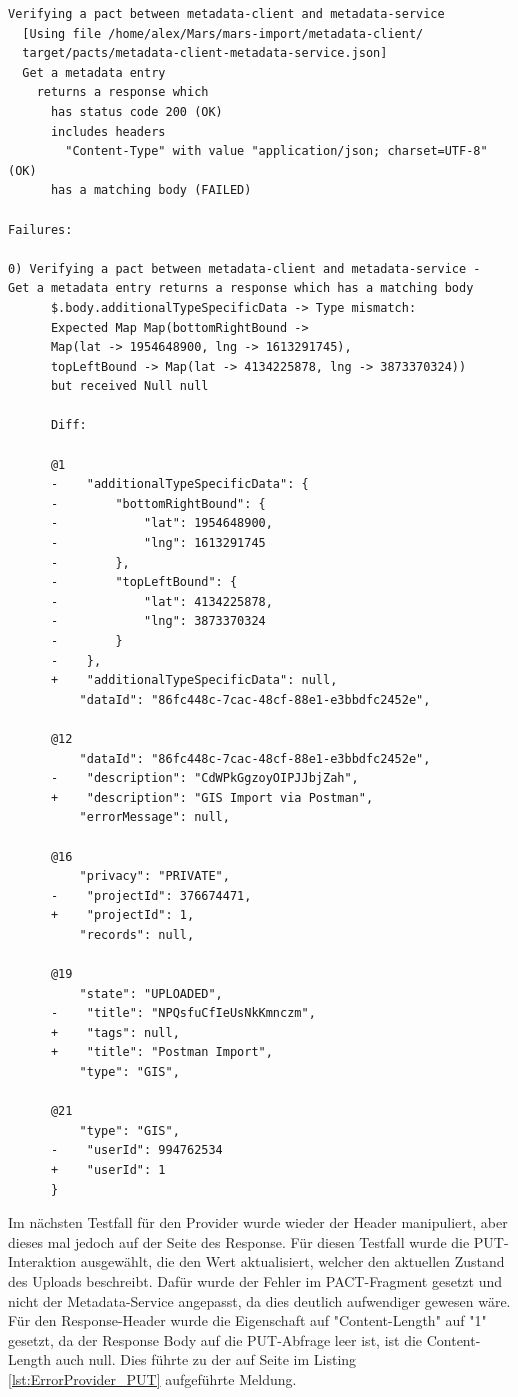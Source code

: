 \documentclass{llncs}
\begin{document}
\lstset{language = Java}
\begin{lstlisting}[caption=Test,label={lst:ErrorProvider_GET}]
Verifying a pact between metadata-client and metadata-service
  [Using file /home/alex/Mars/mars-import/metadata-client/
  target/pacts/metadata-client-metadata-service.json]
  Get a metadata entry
    returns a response which
      has status code 200 (OK)
      includes headers
        "Content-Type" with value "application/json; charset=UTF-8" (OK)
      has a matching body (FAILED)

Failures:

0) Verifying a pact between metadata-client and metadata-service - 
Get a metadata entry returns a response which has a matching body
      $.body.additionalTypeSpecificData -> Type mismatch: 
      Expected Map Map(bottomRightBound -> 
      Map(lat -> 1954648900, lng -> 1613291745), 
      topLeftBound -> Map(lat -> 4134225878, lng -> 3873370324)) 
      but received Null null

      Diff:

      @1
      -    "additionalTypeSpecificData": {
      -        "bottomRightBound": {
      -            "lat": 1954648900,
      -            "lng": 1613291745
      -        },
      -        "topLeftBound": {
      -            "lat": 4134225878,
      -            "lng": 3873370324
      -        }
      -    },
      +    "additionalTypeSpecificData": null,
          "dataId": "86fc448c-7cac-48cf-88e1-e3bbdfc2452e",
      
      @12
          "dataId": "86fc448c-7cac-48cf-88e1-e3bbdfc2452e",
      -    "description": "CdWPkGgzoyOIPJJbjZah",
      +    "description": "GIS Import via Postman",
          "errorMessage": null,
      
      @16
          "privacy": "PRIVATE",
      -    "projectId": 376674471,
      +    "projectId": 1,
          "records": null,
      
      @19
          "state": "UPLOADED",
      -    "title": "NPQsfuCfIeUsNkKmnczm",
      +    "tags": null,
      +    "title": "Postman Import",
          "type": "GIS",
      
      @21
          "type": "GIS",
      -    "userId": 994762534
      +    "userId": 1
      }
\end{lstlisting}

Im nächsten Testfall für den Provider wurde wieder der Header manipuliert, aber dieses mal jedoch auf der Seite des Response. Für diesen Testfall wurde die PUT-Interaktion ausgewählt, die den Wert aktualisiert, welcher den aktuellen Zustand des Uploads beschreibt. Dafür wurde der Fehler im PACT-Fragment gesetzt und nicht der Metadata-Service angepasst, da dies deutlich aufwendiger gewesen wäre. Für den Response-Header wurde die Eigenschaft auf "Content-Length" auf "1" gesetzt, da der Response Body auf die PUT-Abfrage leer ist, ist die Content-Length auch null. Dies führte zu der auf Seite \pageref{lst:ErrorProvider_PUT} im Listing \ref{lst:ErrorProvider_PUT} aufgeführte Meldung.
\end{document}
